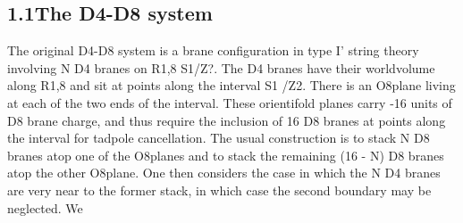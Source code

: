 \documentclass{article}
\begin{document}
\subsection*{1.1The D4-D8 system}


The original D4-D8 system is a brane configuration in type I' string theory involving N D4
branes on R1,8  S1/Z?. The D4 branes have their worldvolume along R1,8 and sit at points
along the interval S1 /Z2. There is an O8plane living at each of the two ends of the interval.
These orientifold planes carry -16 units of D8 brane charge, and thus require the inclusion
of 16 D8 branes at points along the interval for tadpole cancellation. The usual construction
is to stack N D8 branes atop one of the O8planes and to stack the remaining (16 - N)
D8 branes atop the other O8plane. One then considers the case in which the N D4 branes
are very near to the former stack, in which case the second boundary may be neglected. We
\end{document}
